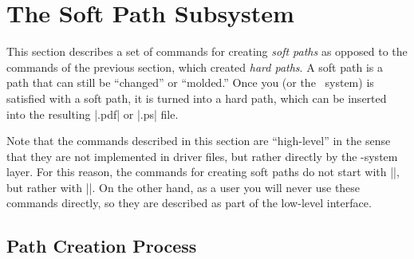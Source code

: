 %
%
%



\section{The Soft Path Subsystem}

\label{section-soft-paths}

\makeatletter


This section describes a set of commands for creating \emph{soft
  paths} as opposed to the commands of the previous section, which
created \emph{hard paths}. A soft path is a path that can still be
``changed'' or ``molded.'' Once you (or the \pgfname\ system) is
satisfied with a soft path, it is turned into a hard path, which can
be inserted into the resulting |.pdf| or |.ps| file.

Note that the commands described in this section are ``high-level'' in
the sense that they are not implemented in driver files, but rather
directly by the \pgfname-system layer. For this reason, the commands for
creating soft paths do not start with |\pgfsys@|, but rather with
|\pgfsyssoftpath@|. On the other hand, as a user you will never use
these commands directly, so they are described as part of the
low-level interface.



\subsection{Path Creation Process}

